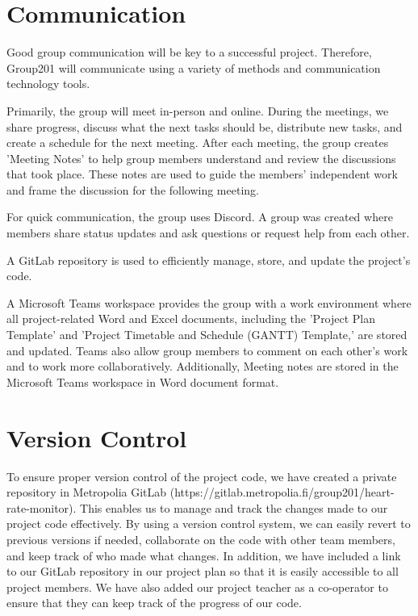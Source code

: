 \documentclass{article}
\begin{document}
\section{Communication}
Good group communication will be key to a successful project. Therefore, Group201 will communicate using a variety of methods and communication technology tools.

Primarily, the group will meet in-person and online. During the meetings, we share progress, discuss what the next tasks should be, distribute new tasks, and create a schedule for the next meeting. After each meeting, the group creates 'Meeting Notes' to help group members understand and review the discussions that took place. These notes are used to guide the members’ independent work and frame the discussion for the following meeting.

For quick communication, the group uses Discord. A group was created where members share status updates and ask questions or request help from each other.

A GitLab repository is used to efficiently manage, store, and update the project’s code.

A Microsoft Teams workspace provides the group with a work environment where all project-related Word and Excel documents, including the 'Project Plan Template' and 'Project Timetable and Schedule (GANTT) Template,' are stored and updated. Teams also allow group members to comment on each other’s work and to work more collaboratively. Additionally, Meeting notes are stored in the Microsoft Teams workspace in Word document format.

\section{Version Control}
To ensure proper version control of the project code, we have created a private repository in Metropolia GitLab (https://gitlab.metropolia.fi/group201/heart-rate-monitor). This enables us to manage and track the changes made to our project code effectively. By using a version control system, we can easily revert to previous versions if needed, collaborate on the code with other team members, and keep track of who made what changes. In addition, we have included a link to our GitLab repository in our project plan so that it is easily accessible to all project members. We have also added our project teacher as a co-operator to ensure that they can keep track of the progress of our code.
\end{document}
